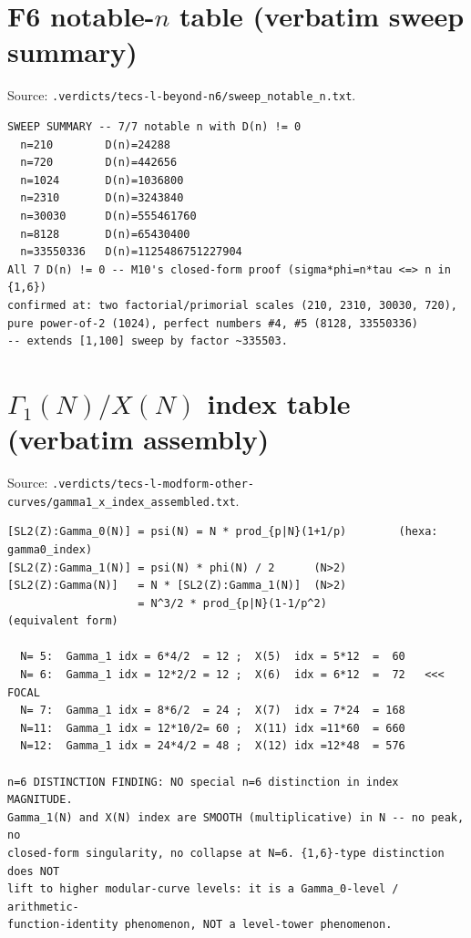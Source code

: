 \documentclass[11pt,a4paper]{article}
\theoremstyle{definition}
\begin{document}
\section{F6 notable-$n$ table (verbatim sweep summary)}
\label{app:f6-table}

Source: \texttt{.verdicts/tecs-l-beyond-n6/sweep\_notable\_n.txt}.

\begin{verbatim}
SWEEP SUMMARY -- 7/7 notable n with D(n) != 0
  n=210        D(n)=24288
  n=720        D(n)=442656
  n=1024       D(n)=1036800
  n=2310       D(n)=3243840
  n=30030      D(n)=555461760
  n=8128       D(n)=65430400
  n=33550336   D(n)=1125486751227904
All 7 D(n) != 0 -- M10's closed-form proof (sigma*phi=n*tau <=> n in {1,6})
confirmed at: two factorial/primorial scales (210, 2310, 30030, 720),
pure power-of-2 (1024), perfect numbers #4, #5 (8128, 33550336)
-- extends [1,100] sweep by factor ~335503.
\end{verbatim}

\section{$\Gamma_1(N)/X(N)$ index table (verbatim assembly)}
\label{app:gamma1-table}

Source: \texttt{.verdicts/tecs-l-modform-other-curves/gamma1\_x\_index\_assembled.txt}.

\begin{verbatim}
[SL2(Z):Gamma_0(N)] = psi(N) = N * prod_{p|N}(1+1/p)        (hexa: gamma0_index)
[SL2(Z):Gamma_1(N)] = psi(N) * phi(N) / 2      (N>2)
[SL2(Z):Gamma(N)]   = N * [SL2(Z):Gamma_1(N)]  (N>2)
                    = N^3/2 * prod_{p|N}(1-1/p^2)            (equivalent form)

  N= 5:  Gamma_1 idx = 6*4/2  = 12 ;  X(5)  idx = 5*12  =  60
  N= 6:  Gamma_1 idx = 12*2/2 = 12 ;  X(6)  idx = 6*12  =  72   <<< FOCAL
  N= 7:  Gamma_1 idx = 8*6/2  = 24 ;  X(7)  idx = 7*24  = 168
  N=11:  Gamma_1 idx = 12*10/2= 60 ;  X(11) idx =11*60  = 660
  N=12:  Gamma_1 idx = 24*4/2 = 48 ;  X(12) idx =12*48  = 576

n=6 DISTINCTION FINDING: NO special n=6 distinction in index MAGNITUDE.
Gamma_1(N) and X(N) index are SMOOTH (multiplicative) in N -- no peak, no
closed-form singularity, no collapse at N=6. {1,6}-type distinction does NOT
lift to higher modular-curve levels: it is a Gamma_0-level / arithmetic-
function-identity phenomenon, NOT a level-tower phenomenon.
\end{verbatim}
\end{document}
